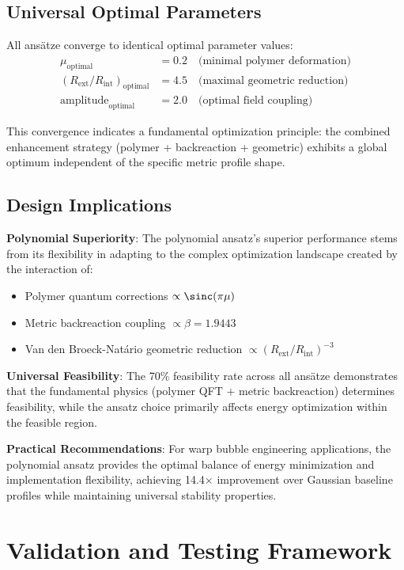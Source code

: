 \documentclass[12pt,a4paper]{article}
\begin{document}
\subsection{Universal Optimal Parameters}

All ansätze converge to identical optimal parameter values:
\begin{align}
\mu_{\text{optimal}} &= 0.2 \quad \text{(minimal polymer deformation)} \\
(R_{\text{ext}}/R_{\text{int}})_{\text{optimal}} &= 4.5 \quad \text{(maximal geometric reduction)} \\
\text{amplitude}_{\text{optimal}} &= 2.0 \quad \text{(optimal field coupling)}
\end{align}

This convergence indicates a fundamental optimization principle: the combined enhancement strategy (polymer + backreaction + geometric) exhibits a global optimum independent of the specific metric profile shape.

\subsection{Design Implications}

\textbf{Polynomial Superiority}: The polynomial ansatz's superior performance stems from its flexibility in adapting to the complex optimization landscape created by the interaction of:
\begin{itemize}
\item Polymer quantum corrections $\propto \sinc(\pi\mu)$
\item Metric backreaction coupling $\propto \beta = 1.9443$
\item Van den Broeck-Natário geometric reduction $\propto (R_{\text{ext}}/R_{\text{int}})^{-3}$
\end{itemize}

\textbf{Universal Feasibility}: The 70\% feasibility rate across all ansätze demonstrates that the fundamental physics (polymer QFT + metric backreaction) determines feasibility, while the ansatz choice primarily affects energy optimization within the feasible region.

\textbf{Practical Recommendations}: For warp bubble engineering applications, the polynomial ansatz provides the optimal balance of energy minimization and implementation flexibility, achieving 14.4× improvement over Gaussian baseline profiles while maintaining universal stability properties.

\section{Validation and Testing Framework}
\label{sec:validation_framework}
\end{document}
